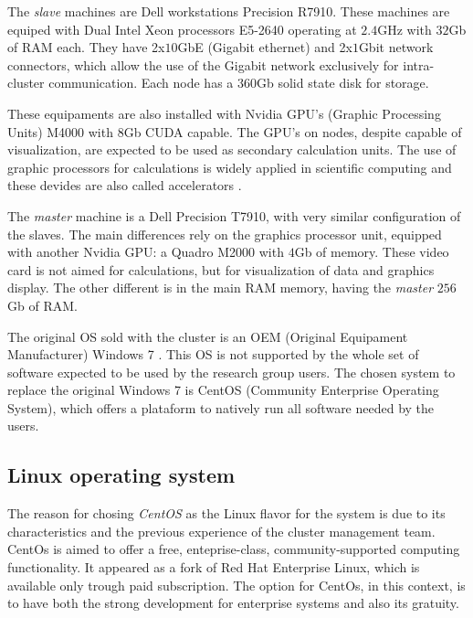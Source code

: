 \documentclass[twoside,a4paper,12pt,english,draft]{inac17}
\begin{document}
The \textit{slave} machines are Dell workstations Precision R7910. These machines are equiped
with Dual Intel{\textregistered} Xeon{\textregistered} processors E5-2640 operating at $2.4$GHz with
$32$Gb of RAM each. They have 2x$10$GbE (Gigabit ethernet) and 2x$1$Gbit network connectors, which
allow the use of the Gigabit network exclusively for intra-cluster communication. Each node
has a $360$Gb solid state disk for storage.

These equipaments are also installed with Nvidia{\textregistered} GPU's (Graphic Processing Units) M4000{\textregistered} with $8$Gb CUDA\cite{CUDA} capable.
The GPU's on nodes, despite capable of visualization, are expected to be used as secondary calculation units.
The use of graphic processors for calculations is widely applied in scientific computing and these devides
are also called accelerators \cite{Accelerators}.

The \textit{master} machine is a Dell Precision T7910, with very similar configuration of the slaves. The main
differences rely on the graphics processor unit, equipped with another Nvidia{\textregistered} GPU: a
Quadro{\textregistered} M2000 with $4$Gb of memory. These video card is not aimed for calculations, but for
visualization of data and graphics display. The other different is in the main RAM memory, having the \textit{master}
$256$Gb of RAM. 

The original OS sold with the cluster is an OEM (Original Equipament Manufacturer) Windows 7{\textregistered} \cite{windows7}. This
OS is not supported by the whole set of software expected to be used by the research group users. The chosen
system to replace the original Windows 7 is CentOS (Community Enterprise Operating System)\cite{centos}, which offers a plataform to natively run all
software needed by the users.

\subsection{Linux operating system}

The reason for chosing \textit{CentOS} as the Linux flavor for the system is due to its characteristics and the previous
experience of the cluster management team. CentOs is aimed to offer a free, enteprise-class, community-supported computing
functionality. It appeared as a fork of Red Hat Enterprise Linux, which is available only trough paid subscription. The option
for CentOs, in this context, is to have both the strong development for enterprise systems and also its gratuity.
\end{document}
